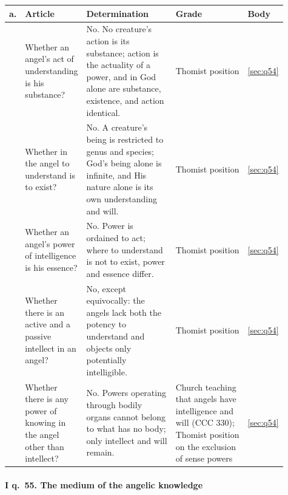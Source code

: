 \begingroup\footnotesize
\begin{longtable}{>{\raggedright\arraybackslash}p{0.03\linewidth}>{\raggedright\arraybackslash}p{0.22\linewidth}>{\raggedright\arraybackslash}p{0.33\linewidth}>{\raggedright\arraybackslash}p{0.27\linewidth}>{\raggedright\arraybackslash}p{0.06\linewidth}}
\toprule
\textbf{a.} & \textbf{Article} & \textbf{Determination} & \textbf{Grade} & \textbf{Body}\\
\midrule
\endhead
1 & Whether an angel's act of understanding is his substance? & No. No creature's action is its substance; action is the actuality of a power, and in God alone are substance, existence, and action identical. & Thomist position & \ref{sec:q54}\\
2 & Whether in the angel to understand is to exist? & No. A creature's being is restricted to genus and species; God's being alone is infinite, and His nature alone is its own understanding and will. & Thomist position & \ref{sec:q54}\\
3 & Whether an angel's power of intelligence is his essence? & No. Power is ordained to act; where to understand is not to exist, power and essence differ. & Thomist position & \ref{sec:q54}\\
4 & Whether there is an active and a passive intellect in an angel? & No, except equivocally: the angels lack both the potency to understand and objects only potentially intelligible. & Thomist position & \ref{sec:q54}\\
5 & Whether there is any power of knowing in the angel other than intellect? & No. Powers operating through bodily organs cannot belong to what has no body; only intellect and will remain. & Church teaching that angels have intelligence and will (CCC 330); Thomist position on the exclusion of sense powers & \ref{sec:q54}\\
\bottomrule
\end{longtable}
\endgroup

\paragraph{I q.~55. The medium of the angelic knowledge}

